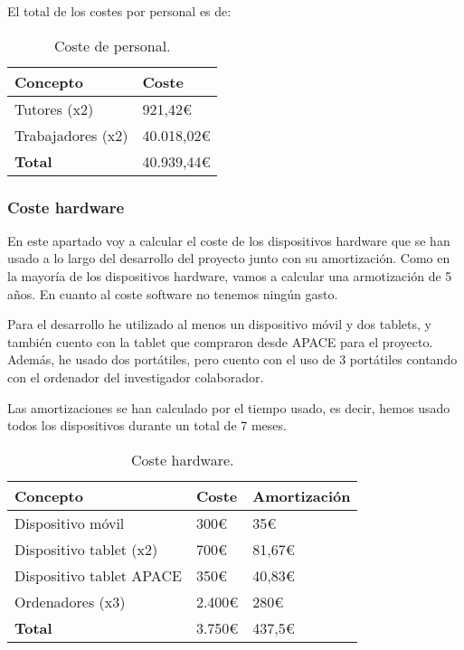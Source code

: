 El total de los costes por personal es de:
\begin{table}[H]
	\centering
	\begin{tabular}{ll}
		\toprule
		\textbf{Concepto} & \textbf{Coste} \\ \midrule
		Tutores (x2)      & 921,42\euro   \\
		Trabajadores (x2) & 40.018,02\euro   \\ \midrule
		\textbf{Total}    & 40.939,44\euro   \\ \bottomrule
	\end{tabular}
	\caption{Coste de personal.}
\end{table}

\subsubsection{Coste hardware}
En este apartado voy a calcular el coste de los dispositivos hardware que se han usado a lo largo del desarrollo del proyecto junto con su amortización. Como en la mayoría de los dispositivos hardware, vamos a calcular una armotización de 5 años. En cuanto al coste software no tenemos ningún gasto.

Para el desarrollo he utilizado al menos un dispositivo móvil y dos tablets, y también cuento con la tablet que compraron desde APACE para el proyecto. Además, he usado dos portátiles, pero cuento con el uso de 3 portátiles contando con el ordenador del investigador colaborador.

Las amortizaciones se han calculado por el tiempo usado, es decir, hemos usado todos los dispositivos durante un total de 7 meses.

\begin{table}[H]
	\centering
	\begin{tabular}{lll}
		\toprule
		\textbf{Concepto}        & \textbf{Coste} & \textbf{Amortización} \\ \midrule
		Dispositivo móvil        & 300\euro        & 35\euro                \\
		Dispositivo tablet (x2)  & 700\euro        & 81,67\euro             \\
		Dispositivo tablet APACE & 350\euro        & 40,83\euro             \\
		Ordenadores (x3)         & 2.400\euro       & 280\euro               \\ \midrule
		\textbf{Total}           & 3.750\euro       & 437,5\euro             \\ \bottomrule
	\end{tabular}
	\caption{Coste hardware.}
\end{table}

